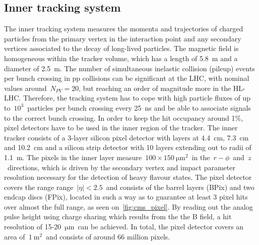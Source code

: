 \subsection{Inner tracking system}
The inner tracking system measures the momenta and trajectories of charged particles from the primary vertex in the interaction point and any secondary vertices associated to the decay of long-lived particles. The magnetic field is homogeneous within the tracker volume, which has a length of 5.8~m and a diameter of 2.5~m. The number of simultaneous inelastic collision (pileup) events per bunch crossing in pp collisions can be significant at the LHC, with nominal values around~$N_{PV} = 20$, but reaching an order of magnitude more in the HL-LHC. Therefore, the tracking system has to cope with high particle fluxes of up to~$10^3$~particles per bunch crossing every 25~ns and be able to associate signals to the correct bunch crossing. In order to keep the hit occupancy around 1\%, pixel detectors have to be used in the inner region of the tracker. The inner tracker consists of a 3-layer silicon pixel detector with layers at 4.4~cm, 7.3~cm and 10.2~cm and a silicon strip detector with 10 layers extending out to radii of 1.1~m. The pixels in the inner layer measure~$100\times150~\mathrm{\mu m}^2$~in the~$r-\phi$~and~$z$~directions, which is driven by the secondary vertex and impact parameter resolution necessary for the detection of heavy flavour states. The pixel detector covers the range range~$|\eta| < 2.5$~and consists of the barrel layers (BPix) and two endcap discs (FPix), located in such a way as to guarantee at least 3 pixel hits over almost the full range, as seen on~\cref{fig:cms_pixel}. By reading out the analog pulse height using charge sharing which results from the the B field, a hit resolution of 15-20~$\mathrm{\mu m}$~can be achieved. In total, the pixel detector covers an area of~$1~\mathrm{m}^2$~and consists of around 66 million pixels.

